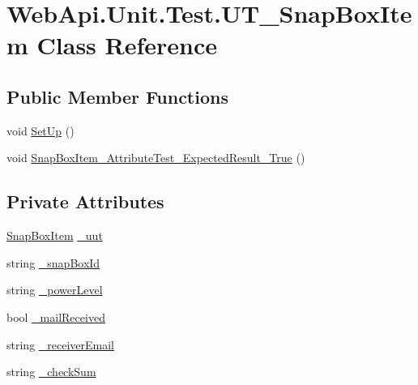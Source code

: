 \hypertarget{class_web_api_1_1_unit_1_1_test_1_1_u_t___snap_box_item}{}\section{Web\+Api.\+Unit.\+Test.\+U\+T\+\_\+\+Snap\+Box\+Item Class Reference}
\label{class_web_api_1_1_unit_1_1_test_1_1_u_t___snap_box_item}
\subsection*{Public Member Functions}
\begin{DoxyCompactItemize}
\item 
void \mbox{\hyperlink{class_web_api_1_1_unit_1_1_test_1_1_u_t___snap_box_item_a4834d3718a090813be0b2b98dbb222f1}{Set\+Up}} ()
\item 
void \mbox{\hyperlink{class_web_api_1_1_unit_1_1_test_1_1_u_t___snap_box_item_ac30446809dbb8c40cd1bca9a52befa01}{Snap\+Box\+Item\+\_\+\+Attribute\+Test\+\_\+\+Expected\+Result\+\_\+\+True}} ()
\end{DoxyCompactItemize}
\subsection*{Private Attributes}
\begin{DoxyCompactItemize}
\item 
\mbox{\hyperlink{class_f_w_p_s_1_1_models_1_1_snap_box_item}{Snap\+Box\+Item}} \mbox{\hyperlink{class_web_api_1_1_unit_1_1_test_1_1_u_t___snap_box_item_a887b7517348445390b432818617a72a8}{\+\_\+uut}}
\item 
string \mbox{\hyperlink{class_web_api_1_1_unit_1_1_test_1_1_u_t___snap_box_item_aac9d64ae81fdb8abc7c952ccdf34c5d2}{\+\_\+snap\+Box\+Id}}
\item 
string \mbox{\hyperlink{class_web_api_1_1_unit_1_1_test_1_1_u_t___snap_box_item_a58efb3e548fc9f2e7ce4d335838c5363}{\+\_\+power\+Level}}
\item 
bool \mbox{\hyperlink{class_web_api_1_1_unit_1_1_test_1_1_u_t___snap_box_item_a13c2ae03fd00c4a6f6daa87201bcc7c2}{\+\_\+mail\+Received}}
\item 
string \mbox{\hyperlink{class_web_api_1_1_unit_1_1_test_1_1_u_t___snap_box_item_a6d95c46daaa2b029cd4f0c1fc7cb1490}{\+\_\+receiver\+Email}}
\item 
string \mbox{\hyperlink{class_web_api_1_1_unit_1_1_test_1_1_u_t___snap_box_item_af9679722037fc7504bb2bfe197a3448d}{\+\_\+check\+Sum}}
\end{DoxyCompactItemize}


